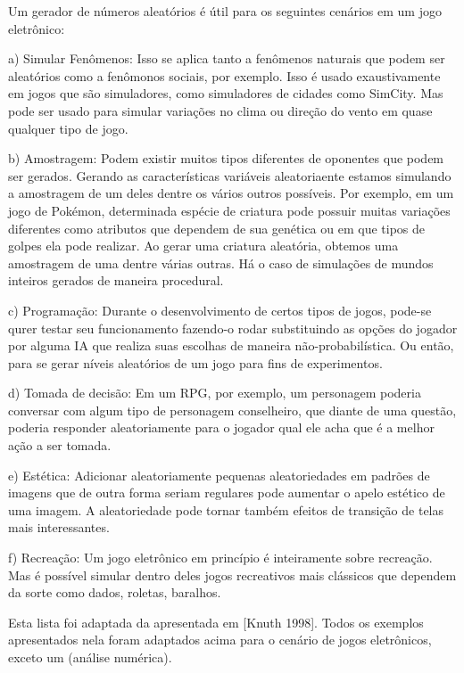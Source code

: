 

Um gerador de números aleatórios é útil para os seguintes cenários em
um jogo eletrônico:

a) Simular Fenômenos: Isso se aplica tanto a fenômenos naturais que
podem ser aleatórios como a fenômonos sociais, por exemplo. Isso é
usado exaustivamente em jogos que são simuladores, como simuladores de
cidades como SimCity. Mas pode ser usado para simular variações no
clima ou direção do vento em quase qualquer tipo de jogo.

b) Amostragem: Podem existir muitos tipos diferentes de oponentes que
podem ser gerados. Gerando as características variáveis aleatoriaente
estamos simulando a amostragem de um deles dentre os vários outros
possíveis. Por exemplo, em um jogo de Pokémon, determinada espécie de
criatura pode possuir muitas variações diferentes como atributos que
dependem de sua genética ou em que tipos de golpes ela pode
realizar. Ao gerar uma criatura aleatória, obtemos uma amostragem de
uma dentre várias outras. Há o caso de simulações de mundos inteiros
gerados de maneira procedural.

c) Programação: Durante o desenvolvimento de certos tipos de jogos,
pode-se qurer testar seu funcionamento fazendo-o rodar substituindo as
opções do jogador por alguma IA que realiza suas escolhas de maneira
não-probabilística. Ou então, para se gerar níveis aleatórios de um
jogo para fins de experimentos.

d) Tomada de decisão: Em um RPG, por exemplo, um personagem poderia
conversar com algum tipo de personagem conselheiro, que diante de uma
questão, poderia responder aleatoriamente para o jogador qual ele acha
que é a melhor ação a ser tomada.

e) Estética: Adicionar aleatoriamente pequenas aleatoriedades em
padrões de imagens que de outra forma seriam regulares pode aumentar o
apelo estético de uma imagem. A aleatoriedade pode tornar também
efeitos de transição de telas mais interessantes.

f) Recreação: Um jogo eletrônico em princípio é inteiramente sobre
recreação. Mas é possível simular dentro deles jogos recreativos mais
clássicos que dependem da sorte como dados, roletas, baralhos.

Esta lista foi adaptada da apresentada em [Knuth 1998]. Todos os
exemplos apresentados nela foram adaptados acima para o cenário de
jogos eletrônicos, exceto um (análise numérica).

